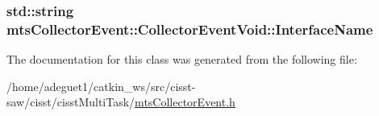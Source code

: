 \hypertarget{classmts_collector_event_1_1_collector_event_void_a40cc93e11bb1411b32e608030473939d}{
\subsubsection[{Interface\-Name}]{\setlength{\rightskip}{0pt plus 5cm}std\-::string mts\-Collector\-Event\-::\-Collector\-Event\-Void\-::\-Interface\-Name}}\label{classmts_collector_event_1_1_collector_event_void_a40cc93e11bb1411b32e608030473939d}


The documentation for this class was generated from the following file\-:\begin{DoxyCompactItemize}
\item 
/home/adeguet1/catkin\-\_\-ws/src/cisst-\/saw/cisst/cisst\-Multi\-Task/\hyperlink{mts_collector_event_8h}{mts\-Collector\-Event.\-h}\end{DoxyCompactItemize}
